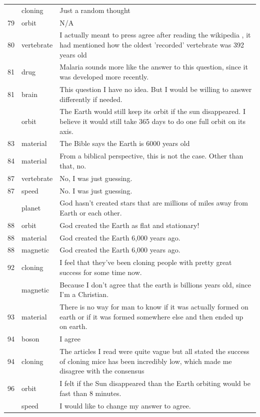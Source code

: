 \documentclass[
  doc,floatsintext]{apa6}
\begin{document}
\begin{longtable}[t]{>{}r>{}l>{\raggedright\arraybackslash}p{30em}}
\addlinespace
78 & cloning & Just a random thought\\
79 & orbit & N/A\\
80 & vertebrate & I actually meant to press agree after reading the wikipedia , it had mentioned how the oldest 'recorded' vertebrate was 392 years old\\
81 & drug & Malaria sounds more like the answer to this question, since it was developed more recently.\\
81 & brain & This question I have no idea. But I would be willing to answer differently if needed.\\
\addlinespace
81 & orbit & The Earth would still keep its orbit if the sun disappeared. I believe it would still take 365 days to do one full orbit on its axis.\\
83 & material & The Bible says the Earth is 6000 years old\\
84 & material & From a biblical perspective, this is not the case. Other than that, no.\\
87 & vertebrate & No, I was just guessing.\\
87 & speed & No. I was just guessing.\\
\addlinespace
88 & planet & God hasn't created stars that are millions of miles away from Earth or each other.\\
88 & orbit & God created the Earth as flat and stationary!\\
88 & material & God created the Earth 6,000 years ago.\\
88 & magnetic & God created the Earth 6,000 years ago.\\
92 & cloning & I feel that they've been cloning people with pretty great success for some time now.\\
\addlinespace
92 & magnetic & Because I don't agree that the earth is billions years old, since I'm a Christian.\\
93 & material & There is no way for man to know if it was actually formed on earth or if it was formed somewhere else and then ended up on earth.\\
94 & boson & I agree\\
94 & cloning & The articles I read were quite vague but all stated the success of cloning mice has been incredibly low, which made me disagree with the consensus\\
96 & orbit & I felt if the Sun disappeared than the Earth orbiting would be fast than 8 minutes.\\
\addlinespace
96 & speed & I would like to change my answer to agree.\\

\end{longtable}
\end{document}
